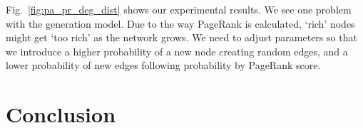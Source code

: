 \documentclass[10pt,twocolumn]{article}
\begin{document}
Fig.~\ref{fig:pa_pr_deg_dist} shows our experimental results. We see one problem with the generation model. Due to the way PageRank is calculated, `rich' nodes might get `too rich' as the network grows. We need to adjust parameters so that we introduce a higher probability of a new node creating random edges, and a lower probability of new edges following probability by PageRank score.

\section{Conclusion} 




\end{document}
